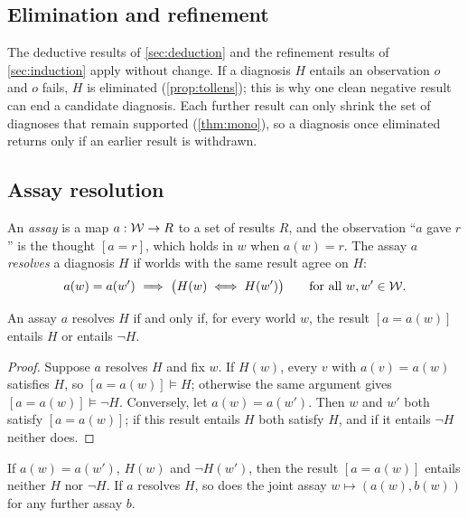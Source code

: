 \subsection{Elimination and refinement}

The deductive results of \cref{sec:deduction} and the refinement results of
\cref{sec:induction} apply without change. If a diagnosis $H$ entails an observation $o$ and $o$
fails, $H$ is eliminated (\cref{prop:tollens}); this is why one clean negative result can end a
candidate diagnosis. Each further result can only shrink the set of diagnoses that remain
supported (\cref{thm:mono}), so a diagnosis once eliminated returns only if an earlier result is
withdrawn.

\subsection{Assay resolution}

\begin{definition}\label{def:resolves}
An \emph{assay} is a map $a:\mathcal W\to R$ to a set of results $R$, and the observation ``$a$ gave
$r$'' is the thought $[a=r]$, which holds in $w$ when $a(w)=r$. The assay $a$ \emph{resolves} a
diagnosis $H$ if worlds with the same result agree on $H$:
\[
  a(w)=a(w')\ \Longrightarrow\ \bigl(H(w)\iff H(w')\bigr)\qquad\text{for all }w,w'\in\mathcal W.
\]
\end{definition}

\begin{theorem}\label{thm:resolves}
An assay $a$ resolves $H$ if and only if, for every world $w$, the result $[a=a(w)]$ entails $H$
or entails $\neg H$.
\end{theorem}

\begin{proof}
Suppose $a$ resolves $H$ and fix $w$. If $H(w)$, every $v$ with $a(v)=a(w)$ satisfies $H$, so
$[a=a(w)]\models H$; otherwise the same argument gives $[a=a(w)]\models\neg H$. Conversely, let
$a(w)=a(w')$. Then $w$ and $w'$ both satisfy $[a=a(w)]$; if this result entails $H$ both satisfy
$H$, and if it entails $\neg H$ neither does.
\end{proof}

\begin{corollary}\label{cor:undetermined}
If $a(w)=a(w')$, $H(w)$ and $\neg H(w')$, then the result $[a=a(w)]$ entails neither $H$ nor
$\neg H$. If $a$ resolves $H$, so does the joint assay $w\mapsto(a(w),b(w))$ for any further
assay $b$.
\end{corollary}

